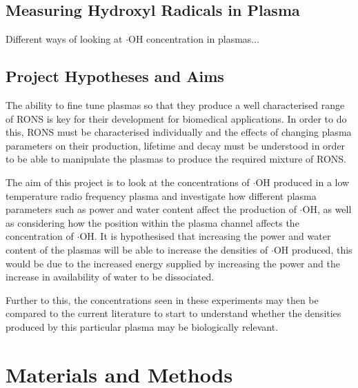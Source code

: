 \documentclass[11pt, oneside]{article}   	%
\begin{document}
\subsection{Measuring Hydroxyl Radicals in Plasma}

Different ways of looking at $\cdot$OH concentration in plasmas...

\subsection{Project Hypotheses and Aims}

The ability to fine tune plasmas so that they produce a well characterised range of RONS is key for their development for biomedical applications.
In order to do this, RONS must be characterised individually and the effects of changing plasma parameters on their production, lifetime and decay must be understood in order to be able to manipulate the plasmas to produce the required mixture of RONS.

The aim of this project is to look at the concentrations of $\cdot$OH produced in a low temperature radio frequency plasma and investigate how different plasma parameters such as power and water content affect the production of $\cdot$OH, as well as considering how the position within the plasma channel affects the concentration of $\cdot$OH.
It is hypothesised that increasing the power and water content of the plasmas will be able to increase the densities of $\cdot$OH produced, this would be due to the increased energy supplied by increasing the power and the increase in availability of water to be dissociated.

Further to this, the concentrations seen in these experiments may then be compared to the current literature to start to understand whether the densities produced by this particular plasma may be biologically relevant.


\section{Materials and Methods}
\end{document}
